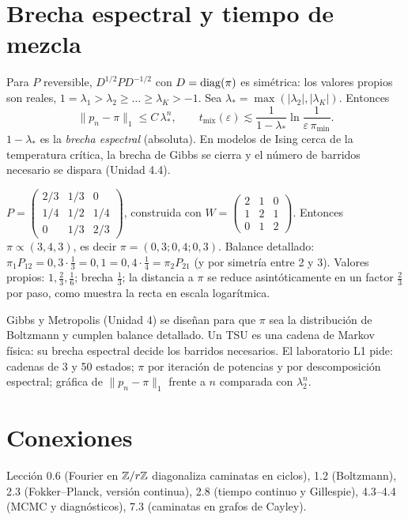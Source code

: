 \documentclass[11pt,a4paper]{article}
\begin{document}
\section{Brecha espectral y tiempo de mezcla}
Para $P$ reversible, $D^{1/2}PD^{-1/2}$ con $D=\operatorname{diag}(\pi)$ es simétrica: los valores propios son reales,
$1=\lambda_1>\lambda_2\ge\dots\ge\lambda_K>-1$. Sea $\lambda_*=\max(|\lambda_2|,|\lambda_K|)$. Entonces
\begin{equation}\|p_n-\pi\|_1\le C\,\lambda_*^n,\qquad t_{\text{mix}}(\varepsilon)\lesssim\frac{1}{1-\lambda_*}\ln\frac{1}{\varepsilon\,\pi_{\min}}.\end{equation}
$1-\lambda_*$ es la \emph{brecha espectral} (absoluta). En modelos de Ising cerca de la temperatura crítica, la brecha
de Gibbs se cierra y el número de barridos necesario se dispara (Unidad 4.4).

\begin{ejemplo}
$P=\begin{pmatrix}2/3&1/3&0\\1/4&1/2&1/4\\0&1/3&2/3\end{pmatrix}$, construida con $W=\begin{pmatrix}2&1&0\\1&2&1\\0&1&2\end{pmatrix}$.
Entonces $\pi\propto(3,4,3)$, es decir $\pi=(0{,}3;0{,}4;0{,}3)$. Balance detallado: $\pi_1P_{12}=0{,}3\cdot\frac13=0{,}1=0{,}4\cdot\frac14=\pi_2P_{21}$
(y por simetría entre 2 y 3). Valores propios: $1,\frac23,\frac16$; brecha $\frac13$; la distancia a $\pi$ se reduce
asintóticamente en un factor $\frac23$ por paso, como muestra la recta en escala logarítmica.
\end{ejemplo}

\begin{aplicacion}
Gibbs y Metropolis (Unidad 4) se diseñan para que $\pi$ sea la distribución de Boltzmann y cumplen balance
detallado. Un TSU es una cadena de Markov física: su brecha espectral decide los barridos necesarios. El
laboratorio L1 pide: cadenas de 3 y 50 estados; $\pi$ por iteración de potencias y por descomposición espectral;
gráfica de $\|p_n-\pi\|_1$ frente a $n$ comparada con $\lambda_2^n$.
\end{aplicacion}

\section{Conexiones}
Lección 0.6 (Fourier en $\mathbb{Z}/r\mathbb{Z}$ diagonaliza caminatas en ciclos), 1.2 (Boltzmann), 2.3 (Fokker--Planck, versión
continua), 2.8 (tiempo continuo y Gillespie), 4.3--4.4 (MCMC y diagnósticos), 7.3 (caminatas en grafos de Cayley).
\end{document}
